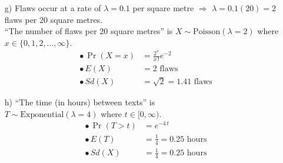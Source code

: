 \documentclass[12pt]{article}
\begin{document}
{\begin{minipage}[t]{0.98\textwidth}
\begin{minipage}[t]{0.47\textwidth}
\begin{enumerate}
\begin{align*}
\end{align*}
\item[g)] Flaws occur at a rate of $\lambda = 0.1$ per square metre $\Rightarrow$ $\lambda = 0.1(20) = 2$ flaws per 20 square metres.\\[0.2cm]
 ``The number of flaws per 20 square metres'' is $X \sim \text{Poisson}(\lambda=2)$ where \\
    $x \in \{0,1,2,\ldots,\infty\}$.
\begin{align*}
\bullet\,\Pr(X = x) &= \frac{2^x}{x\,!}e^{-2} \\[0.2cm]
\bullet\,E(X) &= 2 \text{ flaws}\\[0.2cm]
\bullet\,Sd(X) &= \sqrt{2} = 1.41 \text{ flaws}
\end{align*}
\item[h)] ``The time (in hours) between texts'' is \\$T \sim \text{Exponential}(\lambda=4)$ where $t \in [0,\infty)$.
\begin{align*}
\bullet\,\Pr(T > t) &= e^{-4 \,t}\\[0.2cm]
\bullet\,E(T) &= \frac{1}{4} = 0.25 \text{ hours}\\
\bullet\,Sd(X) &= \frac{1}{4} = 0.25 \text{ hours}
\end{align*}
\end{enumerate}
\end{minipage}
\end{minipage}}\vspace{0.03\textwidth}
\end{document}
